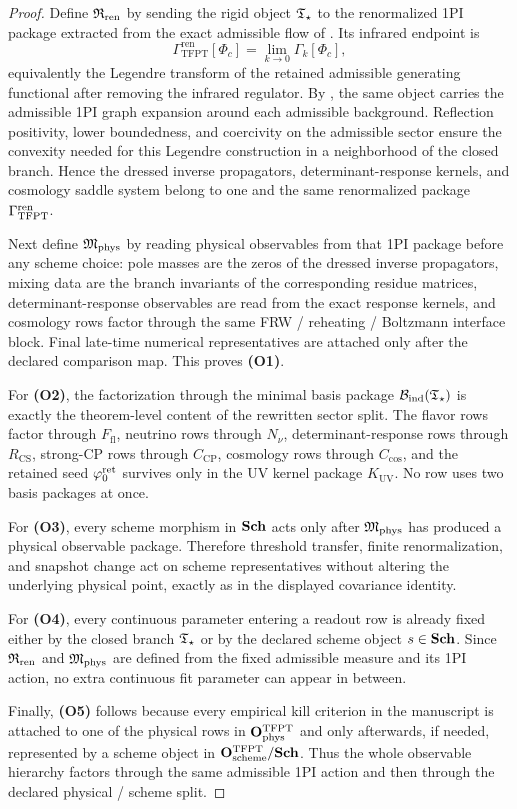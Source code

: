 \begin{proof}
Define $\mathfrak R_{\mathrm{ren}}$ by sending the rigid object $\mathfrak T_{\star}$ to the renormalized 1PI package extracted from
the exact admissible flow of . Its infrared endpoint is
\[
\Gamma_{\mathrm{TFPT}}^{\mathrm{ren}}[\Phi_c]
=
\lim_{k\to0}\Gamma_k[\Phi_c],
\]
equivalently the Legendre transform of the retained admissible generating functional after removing
the infrared regulator. By , the same object carries the
admissible 1PI graph expansion around each admissible background. Reflection positivity, lower
boundedness, and coercivity on the admissible sector ensure the convexity needed for this Legendre
construction in a neighborhood of the closed branch. Hence the dressed inverse propagators,
determinant-response kernels, and cosmology saddle system belong to one and the same renormalized
package $\Gamma_{\mathrm{TFPT}}^{\mathrm{ren}}$.

Next define $\mathfrak M_{\mathrm{phys}}$ by reading physical observables from that 1PI package before any scheme choice:
pole masses are the zeros of the dressed inverse propagators, mixing data are the branch invariants
of the corresponding residue matrices, determinant-response observables are read from the exact
response kernels, and cosmology rows factor through the same FRW / reheating / Boltzmann interface
block. Final late-time numerical representatives are attached only after the declared comparison
map. This proves \textbf{(O1)}.

For \textbf{(O2)}, the factorization through the minimal basis package $\mathcal B_{\mathrm{ind}}(\mathfrak T_{\star})$ is exactly
the theorem-level content of the rewritten sector split. The flavor rows factor through
$F_{\mathrm{fl}}$, neutrino rows through $N_\nu$, determinant-response rows through
$R_{\mathrm{CS}}$, strong-CP rows through $C_{\mathrm{CP}}$, cosmology rows through
$C_{\mathrm{cos}}$, and the retained seed $\varphi_0^{\mathrm{ret}}$ survives only in the UV kernel package
$K_{\mathrm{UV}}$. No row uses two basis packages at once.

For \textbf{(O3)}, every scheme morphism in $\mathbf{Sch}$ acts only after $\mathfrak M_{\mathrm{phys}}$ has produced a
physical observable package. Therefore threshold transfer, finite renormalization, and snapshot
change act on scheme representatives without altering the underlying physical point, exactly as in
the displayed covariance identity.

For \textbf{(O4)}, every continuous parameter entering a readout row is already fixed either by the
closed branch $\mathfrak T_{\star}$ or by the declared scheme object $s\in\mathbf{Sch}$. Since $\mathfrak R_{\mathrm{ren}}$ and $\mathfrak M_{\mathrm{phys}}$
are defined from the fixed admissible measure and its 1PI action, no extra continuous fit parameter
can appear in between.

Finally, \textbf{(O5)} follows because every empirical kill criterion in the manuscript is attached
to one of the physical rows in $\mathbf O_{\mathrm{phys}}^{\mathrm{TFPT}}$ and only afterwards, if needed, represented by a scheme
object in $\mathbf O_{\mathrm{scheme}}^{\mathrm{TFPT}}/\mathbf{Sch}$. Thus the whole observable hierarchy factors through the same
admissible 1PI action and then through the declared physical / scheme split.
\end{proof}
